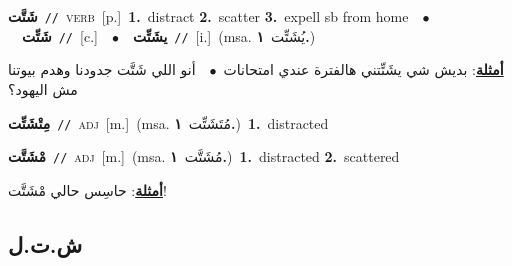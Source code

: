 \documentclass[10pt,a4paper,twoside]{article} %
\begin{document}
\begin{multicols}{2}
{\setlength\topsep{0pt}\textbf{\foreignlanguage{arabic}{شَتَّت}}\ {\color{gray}\texttt{//}\color{black}}\ \textsc{verb}\ [p.]\ \textbf{1.}~distract  \textbf{2.}~scatter  \textbf{3.}~expell sb from home\ \ $\bullet$\ \ \setlength\topsep{0pt}\textbf{\foreignlanguage{arabic}{شَتِّت}}\ {\color{gray}\texttt{//}\color{black}}\ [c.]\ \ $\bullet$\ \ \setlength\topsep{0pt}\textbf{\foreignlanguage{arabic}{يشَتِّت}}\ {\color{gray}\texttt{//}\color{black}}\ [i.]\ \color{gray}(msa. \foreignlanguage{arabic}{يُشَتِّت}~\foreignlanguage{arabic}{\textbf{١.}})\color{black}\  \begin{flushright}\color{gray}\foreignlanguage{arabic}{\textbf{\underline{\foreignlanguage{arabic}{أمثلة}}}: بديش شي يشَتِّتني هالفترة عندي امتحانات\ $\bullet$\ \  أنو اللي شَتَّت جدودنا وهدم بيوتنا مش اليهود؟}\end{flushright}\color{black}} \vspace{2mm}

{\setlength\topsep{0pt}\textbf{\foreignlanguage{arabic}{مِتْشَتِّت}}\ {\color{gray}\texttt{//}\color{black}}\ \textsc{adj}\ [m.]\ \color{gray}(msa. \foreignlanguage{arabic}{مُتَشَتِّت}~\foreignlanguage{arabic}{\textbf{١.}})\color{black}\ \textbf{1.}~distracted\ } \vspace{2mm}

{\setlength\topsep{0pt}\textbf{\foreignlanguage{arabic}{مْشَتَّت}}\ {\color{gray}\texttt{//}\color{black}}\ \textsc{adj}\ [m.]\ \color{gray}(msa. \foreignlanguage{arabic}{مُشَتَّت}~\foreignlanguage{arabic}{\textbf{١.}})\color{black}\ \textbf{1.}~distracted  \textbf{2.}~scattered\  \begin{flushright}\color{gray}\foreignlanguage{arabic}{\textbf{\underline{\foreignlanguage{arabic}{أمثلة}}}: حاسِس حالي مْشَتَّت!}\end{flushright}\color{black}} \vspace{2mm}

\vspace{-3mm}
\subsection*{\color{blue}\foreignlanguage{arabic}{ش.ت.ل}\color{blue}{}} 


\end{multicols}
\end{document}
